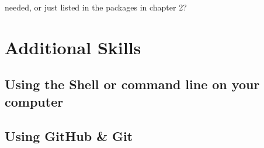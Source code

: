 \documentclass[
  krantz2]{krantz}
\begin{document}
needed, or just listed in the packages in chapter 2?

\hypertarget{additional-skills}{%
\chapter{Additional Skills}\label{additional-skills}}

\hypertarget{using-the-shell-or-command-line-on-your-computer}{%
\section{Using the Shell or command line on your computer}\label{using-the-shell-or-command-line-on-your-computer}}

\hypertarget{using-github-git}{%
\section{Using GitHub \& Git}\label{using-github-git}}

  

\backmatter
\printindex
\end{document}
